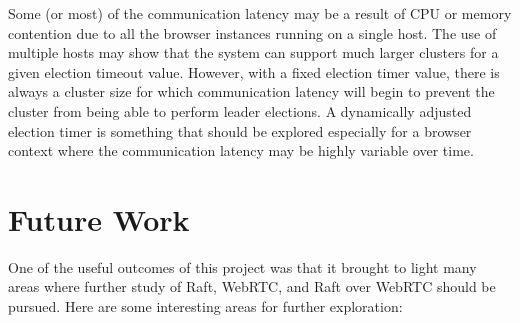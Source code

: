 \documentclass[conference,compsoc]{./IEEEtran/IEEEtran}
\begin{document}
Some (or most) of the communication latency may be a result of CPU or
memory contention due to all the browser instances running on a single
host. The use of multiple hosts may show that the system can support
much larger clusters for a given election timeout value. However, with
a fixed election timer value, there is always a cluster size for which
communication latency will begin to prevent the cluster from being
able to perform leader elections. A dynamically adjusted election
timer is something that should be explored especially for a browser
context where the communication latency may be highly variable over
time.


\section{Future Work}

One of the useful outcomes of this project was that it brought to
light many areas where further study of Raft, WebRTC, and Raft over
WebRTC should be pursued. Here are some interesting areas for further
exploration:
\end{document}
